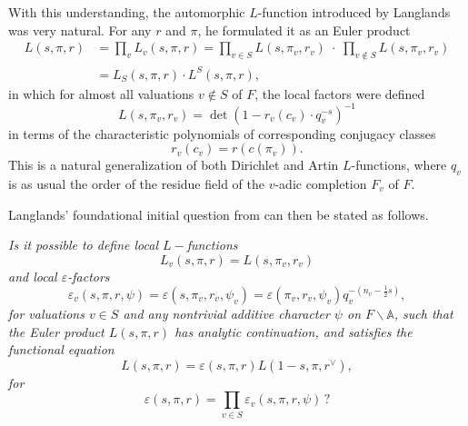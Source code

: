 \documentclass[preprint,12pt, leqno]{elsarticle}
\newcommand{\mA}{\mathbb{A}}
\numberwithin{equation}{section}
\theoremstyle{named}
\begin{document}
With this understanding, the automorphic $L$-function introduced by Langlands was very natural. For any $r$ and $\pi$, he formulated it as an Euler product
\begin{align*}
    L(s, \pi, r) &= \prod_v L_v(s, \pi, r) = \prod_{v\in S} L(s, \pi_v, r_v) \;\cdot\; \prod_{v\notin S} L(s, \pi_v, r_v)\\
    &= L_S(s, \pi, r)\cdot L^S(s, \pi, r),
\end{align*}
in which for almost all valuations $v\notin S$ of $F$, the local factors were defined
\begin{equation*}
    L(s, \pi_v, r_v) = \det(1 - r_v(c_v)\cdot q_v^{-s})^{-1}
\end{equation*}
in terms of the characteristic polynomials of corresponding conjugacy classes
\begin{equation*}
    r_v(c_v) = r(c(\pi_v)).
\end{equation*}
This is a natural generalization of both Dirichlet and Artin $L$-functions, where $q_v$ is as usual the order of the residue field of the $v$-adic completion $F_v$ of $F$.

Langlands' foundational initial question from \cite{L2} can then be stated as follows.
\begin{description}[leftmargin = 0pt]
    \item[Langlands Question 1 \cite{L2}:] \textit{Is it possible to define local $L-$functions
    \begin{equation*}
        L_v(s, \pi, r) = L(s, \pi_v, r_v)
    \end{equation*}
    and local $\varepsilon$-factors
    \begin{equation*}
        \varepsilon_v(s, \pi, r, \psi) = \varepsilon(s, \pi_v, r_v, \psi_v) = \varepsilon(\pi_v, r_v, \psi_v)q_v^{-(n_v - \frac{1}{2}s)},
    \end{equation*}
    for valuations $v\in S$ and any nontrivial additive character $\psi$ on $F\backslash\mA$, such that the Euler product $L(s, \pi, r)$ has analytic continuation, and satisfies the functional equation
    \begin{equation*}
        L(s, \pi, r) = \varepsilon(s, \pi, r)L(1 - s, \pi, r^{\vee}),
    \end{equation*}
    for
    \begin{equation*}
        \varepsilon(s, \pi, r) = \prod_{v\in S} \varepsilon_v(s, \pi, r, \psi)\,\mbox{?}
    \end{equation*}}
\end{description}
\end{document}
